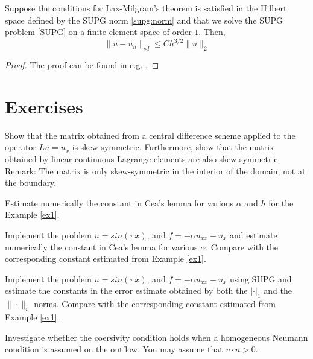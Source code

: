 \begin{theorem}
Suppose the conditions for Lax-Milgram's theorem is satisfied 
in the Hilbert space defined by the SUPG norm \eqref{supg:norm}
and that
we solve the SUPG problem \eqref{SUPG} on a finite element space
of order $1$. Then,  
\[\|u-u_h\|_{sd} \leqslant Ch^{3/2}\|u\|_{2}\]
\end{theorem}

\begin{proof}
The proof can be found in e.g. \cite{elman2014finite, quarteroni2008numerical}. 
\end{proof}

\section{Exercises}

\begin{exercise}
Show that the matrix obtained from a central difference scheme applied to 
the operator $L u = u_x$ is skew-symmetric. Furthermore, show that
the matrix obtained by linear continuous Lagrange elements are also 
skew-symmetric. Remark: The matrix is only skew-symmetric in the  interior
of the domain, not at the boundary.    
\end{exercise}

\begin{exercise}
Estimate numerically the constant in Cea's lemma for various $\alpha$ and $h$ for the  Example \ref{ex1}. 
\end{exercise}

\begin{exercise}
Implement the problem $u=sin(\pi x)$, and $f = -\alpha u_{xx} - u_x$ and 
estimate numerically the constant in Cea's lemma for various $\alpha $.       
Compare with the corresponding constant estimated from Example \ref{ex1}. 
\end{exercise}


\begin{exercise}
Implement the problem $u=sin(\pi x)$, and $f = -\alpha u_{xx} - u_x$ using
SUPG and estimate the constants in the error estimate obtained by 
both the $|\cdot|_1$ and  the $\| \cdot \|_{v}$      
norms. 
Compare with the corresponding constant estimated from Example \ref{ex1}. 
\end{exercise}

 
 
\begin{exercise}
Investigate whether the coersivity condition holds when a 
homogeneous Neumann condition is assumed on the outflow. 
You may assume that $v\cdot n > 0$.   
\end{exercise}

